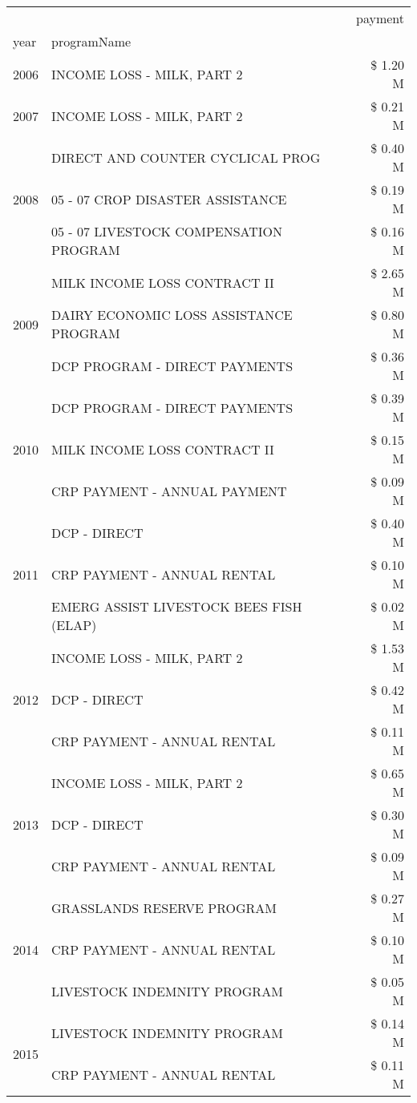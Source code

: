 \begin{tabular}{llr}
\toprule
 &  & payment \\
year & programName &  \\
\midrule
2006 & INCOME LOSS - MILK, PART 2 & \$ 1.20 M \\
\cline{1-3}
2007 & INCOME LOSS - MILK, PART 2 & \$ 0.21 M \\
\cline{1-3}
\multirow[t]{3}{*}{2008} & DIRECT AND COUNTER CYCLICAL PROG & \$ 0.40 M \\
 & 05 - 07 CROP DISASTER ASSISTANCE & \$ 0.19 M \\
 & 05 - 07 LIVESTOCK COMPENSATION PROGRAM & \$ 0.16 M \\
\cline{1-3}
\multirow[t]{3}{*}{2009} & MILK INCOME LOSS CONTRACT II & \$ 2.65 M \\
 & DAIRY ECONOMIC LOSS ASSISTANCE PROGRAM & \$ 0.80 M \\
 & DCP PROGRAM - DIRECT PAYMENTS & \$ 0.36 M \\
\cline{1-3}
\multirow[t]{3}{*}{2010} & DCP PROGRAM - DIRECT PAYMENTS & \$ 0.39 M \\
 & MILK INCOME LOSS CONTRACT II & \$ 0.15 M \\
 & CRP PAYMENT - ANNUAL PAYMENT & \$ 0.09 M \\
\cline{1-3}
\multirow[t]{3}{*}{2011} & DCP - DIRECT & \$ 0.40 M \\
 & CRP PAYMENT - ANNUAL RENTAL & \$ 0.10 M \\
 & EMERG ASSIST LIVESTOCK BEES FISH (ELAP) & \$ 0.02 M \\
\cline{1-3}
\multirow[t]{3}{*}{2012} & INCOME LOSS - MILK, PART 2 & \$ 1.53 M \\
 & DCP - DIRECT & \$ 0.42 M \\
 & CRP PAYMENT - ANNUAL RENTAL & \$ 0.11 M \\
\cline{1-3}
\multirow[t]{3}{*}{2013} & INCOME LOSS - MILK, PART 2 & \$ 0.65 M \\
 & DCP - DIRECT & \$ 0.30 M \\
 & CRP PAYMENT - ANNUAL RENTAL & \$ 0.09 M \\
\cline{1-3}
\multirow[t]{3}{*}{2014} & GRASSLANDS RESERVE PROGRAM & \$ 0.27 M \\
 & CRP PAYMENT - ANNUAL RENTAL & \$ 0.10 M \\
 & LIVESTOCK INDEMNITY PROGRAM & \$ 0.05 M \\
\cline{1-3}
\multirow[t]{3}{*}{2015} & LIVESTOCK INDEMNITY PROGRAM & \$ 0.14 M \\
 & CRP PAYMENT - ANNUAL RENTAL & \$ 0.11 M \\

\end{tabular}
